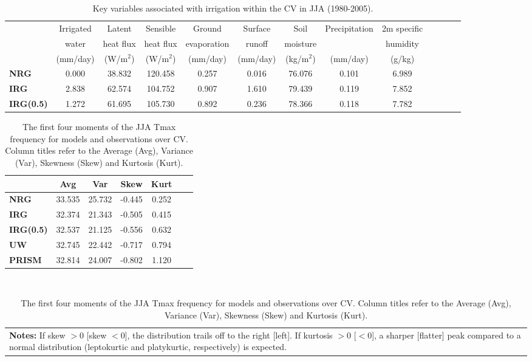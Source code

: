 \documentclass[draft,ms]{agutex}   %
\begin{document}
\begin{table}
\begin{center}
\caption{Key variables associated with irrigation within the CV in JJA (1980-2005).} \label{tab:table2}
\begin{tabular*}{7.5in}{l @{\extracolsep{\fill}}cccccccccccc}
\hline & Irrigated & Latent & Sensible & Ground & Surface & Soil & Precipitation & 2m specific \\ 
& water & heat flux & heat flux & evaporation & runoff & moisture & & humidity \\ 
& (mm/day) & (W/m$^2$) & (W/m$^2$) & (mm/day) & (mm/day) & (kg/m$^2$) & (mm/day) & (g/kg) \\ 
\hline \textbf{NRG} & 0.000 & 38.832 & 120.458 & 0.257 & 0.016 & 76.076 & 0.101 & 6.989 \\  
\textbf{IRG} & 2.838 & 62.574 & 104.752 & 0.907 & 1.610 & 79.439 & 0.119 & 7.852 \\ 
\textbf{IRG(0.5)} & 1.272 & 61.695 & 105.730 & 0.892 & 0.236 & 78.366 & 0.118 & 7.782 \\ 
\hline
\end{tabular*}
\end{center}
\end{table}

\begin{table}
\begin{center}
\caption{The first four moments of the JJA Tmax frequency for models and observations over CV. Column titles refer to the Average (Avg), Variance (Var), Skewness (Skew) and Kurtosis (Kurt).} \label{tab:table3}
\begin{tabular*}{4in}{l @{\extracolsep{\fill}}cccccc}
\hline & Avg &Var & Skew & Kurt \\
\hline \textbf{NRG} & 33.535 & 25.732 & -0.445 & 0.252 \\
\textbf{IRG} & 32.374 & 21.343 & -0.505 & 0.415 \\
\textbf{IRG(0.5)} & 32.537 & 21.125 & -0.556 & 0.632 \\
\textbf{UW} & 32.745 & 22.442 & -0.717 & 0.794 \\
\textbf{PRISM} & 32.814 & 24.007 & -0.802 & 1.120 \\
\hline
\end{tabular*} \\

\begin{tabular}{p{3in}}
\small\textbf{Notes:} If skew $>0$ [skew $<0$], the distribution trails off to the right [left]. If kurtosis $> 0$ [$<0$], a sharper [flatter] peak compared to a normal distribution (leptokurtic and platykurtic, respectively) is expected.
\end{tabular}
\end{center}
\end{table}
\end{document}
